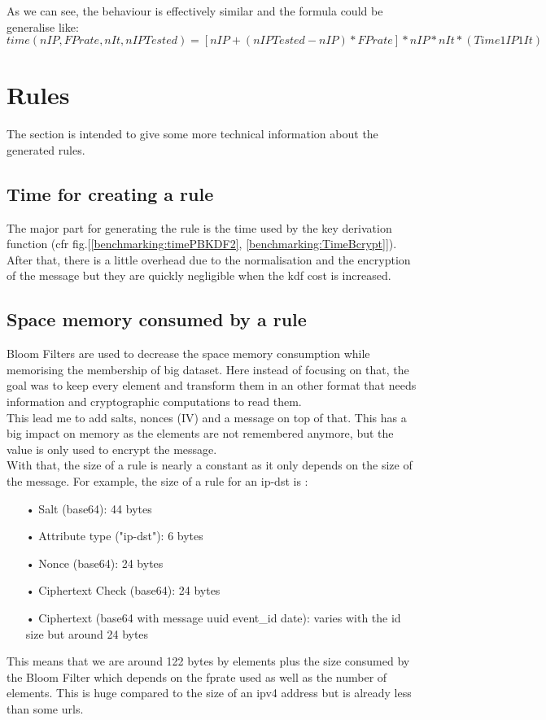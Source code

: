 \documentclass{eplmastersthesis}
\begin{document}
As we can see, the behaviour is effectively similar and the formula could be generalise like:
$$time(nIP, FPrate, nIt, nIPTested)=\left[nIP+(nIPTested-nIP)*FPrate\right]*nIP*nIt*(Time1IP1It)$$

\section{Rules}

The section is intended to give some more technical information about the generated rules.

\subsection{Time for creating a rule}
The major part for generating the rule is the time used by the key derivation function (cfr fig.[\ref{benchmarking:timePBKDF2}, \ref{benchmarking:TimeBcrypt}]). After that, there is a little overhead due to the normalisation and the encryption of the message but they are quickly negligible when the \gls{kdf} cost is increased.\\

\subsection{Space memory consumed by a rule}
Bloom Filters are used to decrease the space memory consumption while memorising the membership of big dataset. Here instead of focusing on that, the goal was to keep every element and transform them in an other format that needs information and cryptographic computations to read them.\\

This lead me to add salts, nonces (IV) and a message on top of that. This has a big impact on memory as the elements are not remembered anymore, but the value is only used to encrypt the message.\\

With that, the size of a rule is nearly a constant as it only depends on the size of the message. For example, the size of a rule for an ip-dst is :
\begin{itemize}
\item[•] Salt (base64): 44 bytes
\item[•] Attribute type ("ip-dst"): 6 bytes
\item[•] Nonce (base64): 24 bytes
\item[•] Ciphertext Check (base64): 24 bytes
\item[•] Ciphertext (base64 with message uuid event\_id date): varies with the id size but around 24 bytes
\end{itemize}
This means that we are around 122 bytes by elements plus the size consumed by the Bloom Filter which depends on the \gls{fp}rate used as well as the number of elements. This is huge compared to the size of an \gls{ipv4} address but is already less than some \gls{url}s.
\end{document}

